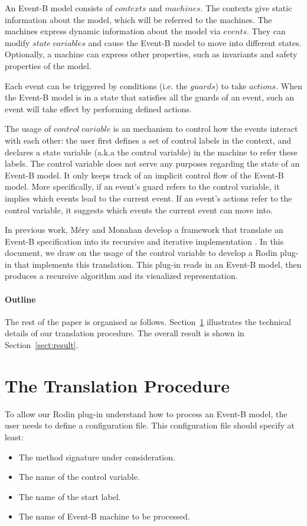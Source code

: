 \documentclass{easychair}
\begin{document}
An Event-B model consists of $contexts$ and $machines$. The contexts give static information about the model, which will be referred to the machines. The machines express dynamic information about the model via $events$. They can modify $state\ variables$ and cause the Event-B model to move into different states. Optionally, a machine can express other properties, such as invariants and safety properties of the model.

Each event can be triggered by conditions (i.e. the $guards$) to take $actions$. When the Event-B model is in a state that satisfies all the guards of an event, such an event will take effect by performing defined actions.

The usage of $control\ variable$ is an mechanism to control how the events interact with each other: the user first defines a set of control labels in the context, and declares a state variable (a.k.a the control variable) in the machine to refer these labels. The control variable does not serve any purposes regarding the state of an Event-B model. It only keeps track of an implicit control flow of the Event-B model. More specifically, if an event's guard refers to the control variable, it implies which events lead to the current event. If an event's actions refer to the control variable, it suggests which events the current event can move into. 

In previous work, M{\'e}ry and Monahan develop a framework that translate an Event-B specification into its recursive and iterative implementation \cite{Mery2013}. In this document, we draw on the usage of the control variable to develop a Rodin plug-in that implements this translation. This plug-in reads in an Event-B model, then produces a recursive algorithm and its visualized representation.

\paragraph{Outline}
The rest of the paper is organised as follows.  
Section~\ref{sect:tp} illustrates the technical details of our translation procedure. 
The overall result is shown in Section~\ref{sect:result}. 

\section{The Translation Procedure}\label{sect:tp}
To allow our Rodin plug-in understand how to process an Event-B model, the user needs to define a configuration file. This configuration file should specify at least:
\begin{itemize}
	\item The method signature under consideration.
	\item The name of the control variable.
	\item The name of the start label.
	\item The name of Event-B machine to be processed.
\end{itemize}
\end{document}
